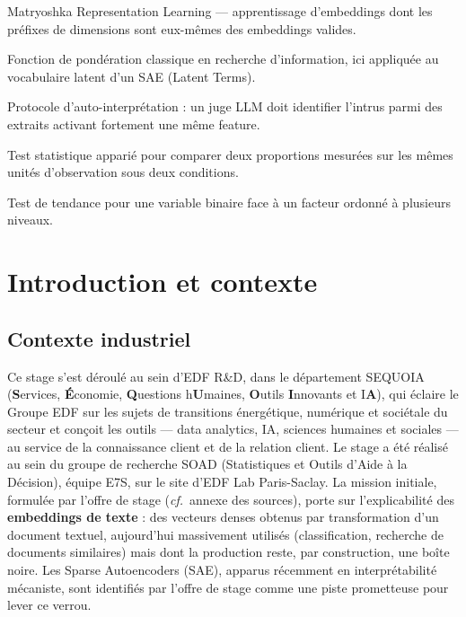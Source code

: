 \documentclass[11pt]{article}
\begin{document}
\begin{description}[leftmargin=3.2cm, style=nextline]
  \item[MRL] Matryoshka Representation Learning --- apprentissage d'embeddings
    dont les préfixes de dimensions sont eux-mêmes des embeddings valides.
  \item[BM25] Fonction de pondération classique en recherche d'information,
    ici appliquée au vocabulaire latent d'un SAE (Latent Terms).
  \item[odd-one-out] Protocole d'auto-interprétation : un juge LLM doit
    identifier l'intrus parmi des extraits activant fortement une même feature.
  \item[McNemar] Test statistique apparié pour comparer deux proportions
    mesurées sur les mêmes unités d'observation sous deux conditions.
  \item[Cochran-Armitage] Test de tendance pour une variable binaire face à un
    facteur ordonné à plusieurs niveaux.
\end{description}

\newpage
\section{Introduction et contexte}

\subsection{Contexte industriel}

Ce stage s'est déroulé au sein d'EDF R\&D, dans le département SEQUOIA
(\textbf{S}ervices, \textbf{É}conomie, \textbf{Q}uestions h\textbf{U}maines,
\textbf{O}utils \textbf{I}nnovants et I\textbf{A}), qui éclaire le Groupe EDF
sur les sujets de transitions énergétique, numérique et sociétale du secteur et conçoit
les outils --- data analytics, IA, sciences humaines et sociales --- au
service de la connaissance client et de la relation client. Le stage a été
réalisé au sein du groupe de recherche SOAD (Statistiques et Outils d'Aide à
la Décision), équipe E7S, sur le site d'EDF Lab Paris-Saclay. La mission
initiale, formulée par l'offre de stage
(\emph{cf.}~annexe des sources), porte sur l'explicabilité des
\textbf{embeddings de texte} : des vecteurs denses obtenus par transformation
d'un document textuel, aujourd'hui massivement utilisés (classification,
recherche de documents similaires) mais dont la production reste, par
construction, une boîte noire. Les Sparse Autoencoders (SAE), apparus
récemment en interprétabilité mécaniste, sont identifiés par l'offre de stage
comme une piste prometteuse pour lever ce verrou.
\end{document}
